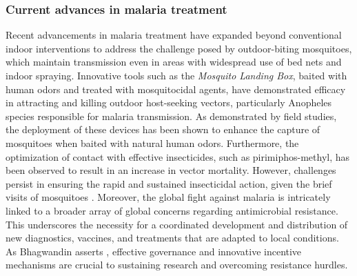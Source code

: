 \subsubsection{Current advances in malaria treatment}
Recent advancements in malaria treatment have expanded beyond conventional indoor interventions to address the challenge posed by outdoor-biting mosquitoes, which maintain transmission even in areas with widespread use of bed nets and indoor spraying. Innovative tools such as the \emph{Mosquito Landing Box}, baited with human odors and treated with mosquitocidal agents, have demonstrated efficacy in attracting and killing outdoor host-seeking vectors, particularly Anopheles species responsible for malaria transmission. As demonstrated by field studies, the deployment of these devices has been shown to enhance the capture of mosquitoes when baited with natural human odors. Furthermore, the optimization of contact with effective insecticides, such as pirimiphos-methyl, has been observed to result in an increase in vector mortality. However, challenges persist in ensuring the rapid and sustained insecticidal action, given the brief visits of mosquitoes \cite{Matowo2013}. Moreover, the global fight against malaria is intricately linked to a broader array of global concerns regarding antimicrobial resistance. This underscores the necessity for a coordinated development and distribution of new diagnostics, vaccines, and treatments that are adapted to local conditions. As Bhagwandin asserts \cite{Bhagwandin}, effective governance and innovative incentive mechanisms are crucial to sustaining research and overcoming resistance hurdles.


